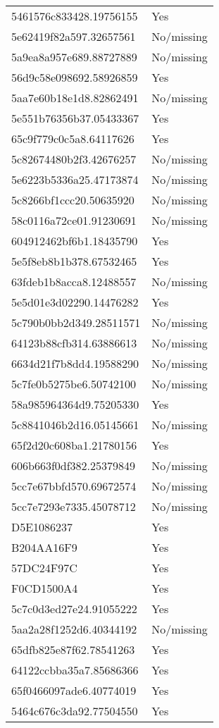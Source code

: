 \begin{tabular}{ll}
5461576c833428.19756155 & Yes \\
5e62419f82a597.32657561 & No/missing \\
5a9ea8a957e689.88727889 & No/missing \\
56d9c58e098692.58926859 & Yes \\
5aa7e60b18e1d8.82862491 & No/missing \\
5e551b76356b37.05433367 & Yes \\
65c9f779c0c5a8.64117626 & Yes \\
5c82674480b2f3.42676257 & No/missing \\
5e6223b5336a25.47173874 & No/missing \\
5c8266bf1ccc20.50635920 & No/missing \\
58c0116a72ce01.91230691 & No/missing \\
604912462bf6b1.18435790 & Yes \\
5e5f8eb8b1b378.67532465 & Yes \\
63fdeb1b8acca8.12488557 & No/missing \\
5e5d01e3d02290.14476282 & Yes \\
5c790b0bb2d349.28511571 & No/missing \\
64123b88cfb314.63886613 & No/missing \\
6634d21f7b8dd4.19588290 & No/missing \\
5c7fe0b5275be6.50742100 & No/missing \\
58a985964364d9.75205330 & Yes \\
5c8841046b2d16.05145661 & No/missing \\
65f2d20c608ba1.21780156 & Yes \\
606b663f0df382.25379849 & No/missing \\
5cc7e67bbfd570.69672574 & No/missing \\
5cc7e7293e7335.45078712 & No/missing \\
D5E1086237 & Yes \\
B204AA16F9 & Yes \\
57DC24F97C & Yes \\
F0CD1500A4 & Yes \\
5c7c0d3ed27e24.91055222 & Yes \\
5aa2a28f1252d6.40344192 & No/missing \\
65dfb825e87f62.78541263 & Yes \\
64122ccbba35a7.85686366 & Yes \\
65f0466097ade6.40774019 & Yes \\
5464c676c3da92.77504550 & Yes \\

\end{tabular}
